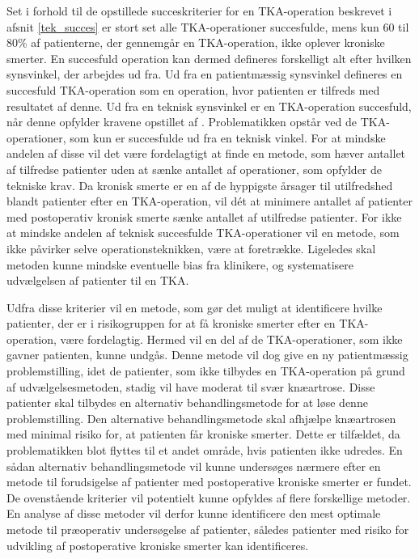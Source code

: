 Set i forhold til de opstillede succeskriterier for en TKA-operation beskrevet i afsnit \ref{tek_succes} er stort set alle TKA-operationer succesfulde, mens kun 60 til 80\% af patienterne, der gennemgår en TKA-operation, ikke oplever kroniske smerter. \citep{Sakellariou2016} \citep{Petersen2015} En succesfuld operation kan dermed defineres forskelligt alt efter hvilken synsvinkel, der arbejdes ud fra. Ud fra en patientmæssig synsvinkel defineres en succesfuld TKA-operation som en operation, hvor patienten er tilfreds med resultatet af denne. Ud fra en teknisk synsvinkel er en TKA-operation succesfuld, når denne opfylder kravene opstillet af . Problematikken opstår ved de TKA-operationer, som kun er succesfulde ud fra en teknisk vinkel. For at mindske andelen af disse vil det være fordelagtigt at finde en metode, som hæver antallet af tilfredse patienter uden at sænke antallet af operationer, som opfylder de tekniske krav. Da kronisk smerte er en af de hyppigste årsager til utilfredshed blandt patienter efter en TKA-operation, vil dét at minimere antallet af patienter med postoperativ kronisk smerte sænke antallet af utilfredse patienter. \citep{Bourne2010} For ikke at mindske andelen af teknisk succesfulde TKA-operationer vil en metode, som ikke påvirker selve operationsteknikken, være at foretrække. Ligeledes skal metoden kunne mindske eventuelle bias fra klinikere, og systematisere udvælgelsen af patienter til en TKA. 

Udfra disse kriterier vil en metode, som gør det muligt at identificere hvilke patienter, der er i risikogruppen for at få kroniske smerter efter en TKA-operation, være fordelagtig. Hermed vil en del af de TKA-operationer, som ikke gavner patienten, kunne undgås. Denne metode vil dog give en ny patientmæssig problemstilling, idet de patienter, som ikke tilbydes en TKA-operation på grund af udvælgelsesmetoden, stadig vil have moderat til svær knæartrose. Disse patienter skal tilbydes en alternativ behandlingsmetode for at løse denne problemstilling. Den alternative behandlingsmetode skal afhjælpe knæartrosen med minimal risiko for, at patienten får kroniske smerter. Dette er tilfældet, da problematikken blot flyttes til et andet område, hvis patienten ikke udredes. En sådan alternativ behandlingsmetode vil kunne undersøges nærmere efter en metode til forudsigelse af patienter med postoperative kroniske smerter er fundet. \\  
De ovenstående kriterier vil potentielt kunne opfyldes af flere forskellige metoder. En analyse af disse metoder vil derfor kunne identificere den mest optimale metode til præoperativ undersøgelse af patienter, således patienter med risiko for udvikling af postoperative kroniske smerter kan identificeres.        

